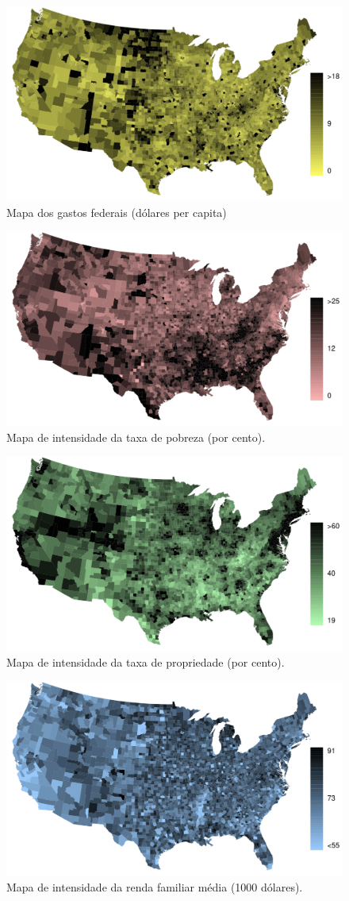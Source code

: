 \documentclass[
]{book}
\theoremstyle{definition}
\theoremstyle{definition}
\theoremstyle{definition}
\theoremstyle{definition}
\theoremstyle{remark}
\begin{document}
\begin{figure}
\includegraphics[width=0.5\linewidth]{images/c1/countyFedSpendMap} \caption{Mapa dos gastos federais (dólares per capita)}\label{fig:countyIntensityMaps1}
\end{figure}

\begin{figure}
\includegraphics[width=0.5\linewidth]{images/c1/countyPovertyMap} \caption{Mapa de intensidade da taxa de pobreza (por cento).}\label{fig:countyIntensityMaps2}
\end{figure}

\begin{figure}
\includegraphics[width=0.5\linewidth]{images/c1/countyMedIncomeMap} \caption{Mapa de intensidade da taxa de propriedade (por cento).}\label{fig:countyIntensityMaps3}
\end{figure}

\begin{figure}
\includegraphics[width=0.5\linewidth]{images/c1/countyHomeownershipMap} \caption{Mapa de intensidade da renda familiar média (1000 dólares).}\label{fig:countyIntensityMaps4}
\end{figure}
\end{document}
